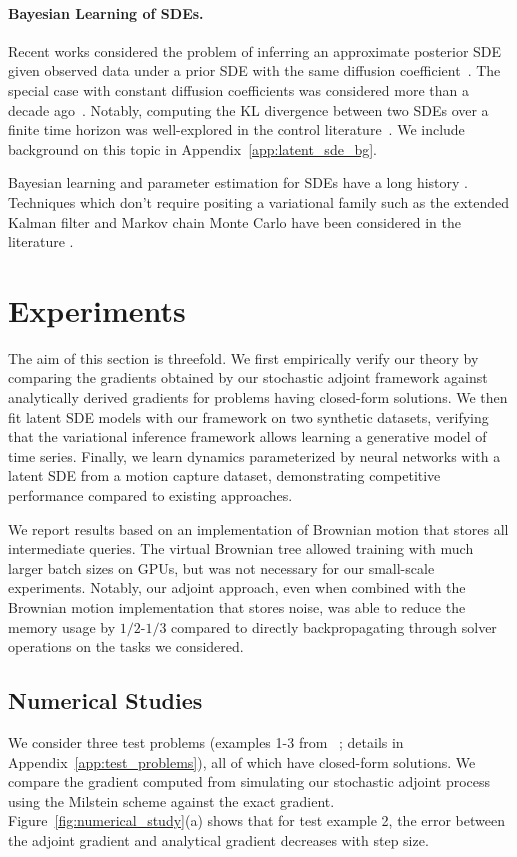 \documentclass[twoside]{article}
\begin{document}
\paragraph{Bayesian Learning of SDEs.}
Recent works considered the problem of inferring an approximate posterior SDE given observed data under a prior SDE with the same diffusion coefficient~\citep{ha2018adaptive,tzen2019neural,opper2019variational}.
The special case with constant diffusion coefficients was considered more than a decade ago~\cite{archambeau2008variational}.
Notably, computing the KL divergence between two SDEs over a finite time horizon was well-explored in the control literature~\citep{kappen2016adaptive,theodorou2015nonlinear}. 
We include background on this topic in Appendix~\ref{app:latent_sde_bg}.

Bayesian learning and parameter estimation for SDEs have a long history \cite{gupta1974computational}. Techniques which don't require positing a variational family such as the extended Kalman filter and Markov chain Monte Carlo have been considered in the literature \cite{mbalawata2013parameter}.
 \vspace{-2mm}
\section{Experiments}
\vspace{-2mm}
The aim of this section is threefold.
We first empirically verify our theory by comparing the gradients obtained by our stochastic adjoint framework against analytically derived gradients for problems having closed-form solutions. 
We then fit latent SDE models with our framework on two synthetic datasets, verifying that the variational inference framework allows learning a generative model of time series. 
Finally, we learn dynamics parameterized by neural networks with a latent SDE from a motion capture dataset, demonstrating competitive performance compared to existing approaches.

We report results based on an implementation of Brownian motion that stores all intermediate queries.
The virtual Brownian tree allowed training with much larger batch sizes on GPUs, but was not necessary for our small-scale experiments.
Notably, our adjoint approach, even when combined with the Brownian motion implementation that stores noise, was able to reduce the memory usage by $1/2$-$1/3$ compared to directly backpropagating through solver operations on the tasks we considered.

\subsection{Numerical Studies}
We consider three test problems (examples 1-3 from ~\cite{rackauckas2017adaptive}; details in Appendix~\ref{app:test_problems}), all of which have closed-form solutions. 
We compare the gradient computed from simulating our stochastic adjoint process using the Milstein scheme against the exact gradient.
Figure~\ref{fig:numerical_study}(a) shows that for test example 2, the error between the adjoint gradient and analytical gradient decreases with step size. 
\end{document}
